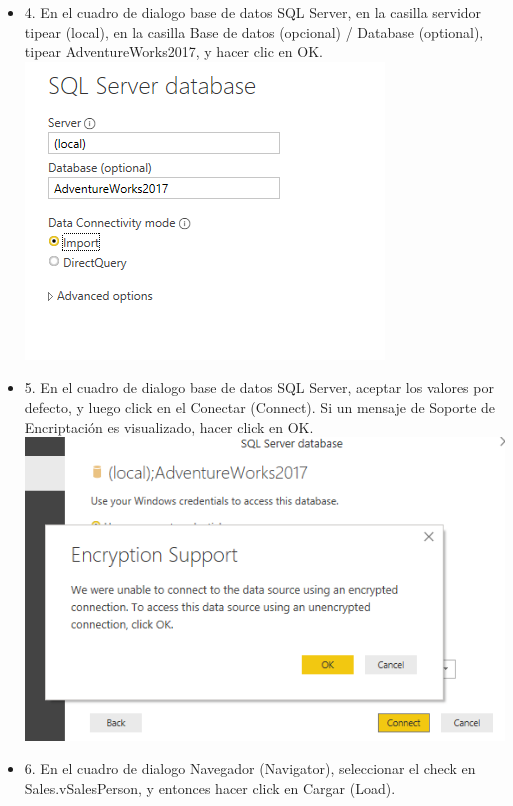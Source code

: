 \begin{itemize}
\item 4. En el cuadro de dialogo base de datos SQL Server, en la casilla servidor tipear (local), en la casilla Base de datos (opcional) / Database (optional), tipear AdventureWorks2017, y hacer clic en OK. \\
\includegraphics[scale=0.5]{./Imagenes/image003}
\item 5. En el cuadro de dialogo base de datos SQL Server, aceptar los valores por defecto, y luego click en el Conectar (Connect). Si un mensaje de Soporte de Encriptación es visualizado, hacer click en OK. \\
\includegraphics[scale=0.5]{./Imagenes/image004}
\item 6. En el cuadro de dialogo Navegador (Navigator), seleccionar el check en Sales.vSalesPerson, y entonces hacer click en Cargar (Load). \\

\end{itemize}
